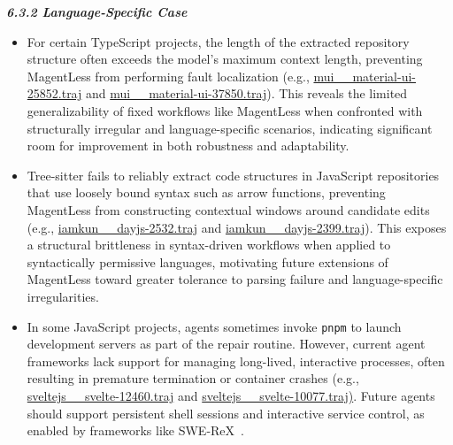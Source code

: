 \documentclass[11pt, a4paper, logo, copyright, nonumbering]{seed}
\newcommand{\magentless}{MagentLess\xspace}
\begin{document}
\noindent\textit{\textbf{6.3.2 Language-Specific Case}}
\vspace{-0.3cm}
\begin{itemize}[leftmargin=*]
    \item For certain TypeScript projects, the length of the extracted repository structure often exceeds the model's maximum context length, preventing \magentless from performing fault localization
    (e.g., \href{https://github.com/multi-swe-bench/experiments/blob/main/evaluation/typescript/verified/20250329_MagentLess_Doubao-1.5-pro/trajs/mui\_\_material-ui-25852.traj}{mui\_\_material-ui-25852.traj} and \href{https://github.com/multi-swe-bench/experiments/blob/main/evaluation/typescript/verified/20250329_MagentLess_Doubao-1.5-pro/trajs/mui\_\_material-ui-37850.traj}{mui\_\_material-ui-37850.traj}).
    This reveals the limited generalizability of fixed workflows like \magentless when confronted with structurally irregular and language-specific scenarios, indicating significant room for improvement in both robustness and adaptability.
    \item Tree-sitter fails to reliably extract code structures in JavaScript repositories that use loosely bound syntax such as arrow functions, preventing \magentless from constructing contextual windows around candidate edits (e.g., \href{https://github.com/multi-swe-bench/experiments/blob/main/evaluation/javascript/verified/20250329_MagentLess_Claude-3.7-Sonnet/trajs/iamkun\_\_dayjs-2532.traj}{iamkun\_\_dayjs-2532.traj} and \href{https://github.com/multi-swe-bench/experiments/blob/main/evaluation/javascript/verified/20250329_MagentLess_Claude-3.7-Sonnet/trajs/iamkun\_\_dayjs-2399.traj}{iamkun\_\_dayjs-2399.traj}).
    This exposes a structural brittleness in syntax-driven workflows when applied to syntactically permissive languages, motivating future extensions of \magentless toward greater tolerance to parsing failure and language-specific irregularities.
    \item In some JavaScript projects, agents sometimes invoke \texttt{pnpm} to launch development servers as part of the repair routine.
    However, current agent frameworks lack support for managing long-lived, interactive processes, often resulting in premature termination or container crashes (e.g., \href{https://github.com/multi-swe-bench/experiments/blob/main/evaluation/javascript/verified/20250329_MSWE-agent_OpenAI-o1/trajs/sveltejs\_\_svelte-12460.traj}{sveltejs\_\_svelte-12460.traj} and \href{https://github.com/multi-swe-bench/experiments/blob/main/evaluation/javascript/verified/20250329_MSWE-agent_OpenAI-o1/trajs/sveltejs\_\_svelte-10077.traj}{sveltejs\_\_svelte-10077.traj)}.
    Future agents should support persistent shell sessions and interactive service control, as enabled by frameworks like SWE-ReX~\citep{swe_rex}.
\end{itemize}
\end{document}
